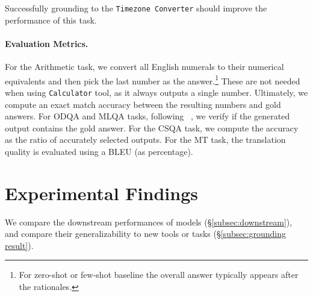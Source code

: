 \documentclass[11pt]{article}
\newcommand{\daniel}[1]{{\color{purple}[DK: #1]}}
\newcommand{\slm}{\textcolor{darkblueTwo}{SLM}}
\newcommand{\name}{{\fontfamily{cmss}\selectfont GEAR}}
\newcommand{\calc}{{\tt Calculator}}
\newcommand{\tz}{{\tt Timezone Converter}}
\newcommand{\gptj}{{\tt \textcolor{darkredTwo}{GPT-J}}}
\begin{document}
\begin{itemize}[leftmargin=0.1in]
    \normalsize
    Successfully grounding to the \tz{} should improve the performance of this task.
\end{itemize}

\paragraph{Evaluation Metrics.} 
For the Arithmetic task, we convert all English numerals to their numerical equivalents and then pick the last number as the answer.\footnote{
For zero-shot or few-shot baseline the overall answer typically appears after the rationales. 
} These are not needed when using \calc{} tool, as it always outputs a single number. Ultimately, we compute an exact match accuracy between the resulting numbers and gold answers.
For ODQA and MLQA tasks, following ~\citep{schick2023toolformer},  we verify if the generated output contains the gold answer. 
For the CSQA task, we compute the accuracy as the ratio of accurately selected outputs.
For the MT task, the translation quality is evaluated using a BLEU (as percentage). 

\section{Experimental Findings}
\label{section:experiment}
We compare the downstream performances of models (\S\ref{subsec:downstream}), and compare their generalizability to new tools or tasks (\S\ref{subsec:grounding result}).

\end{document}
